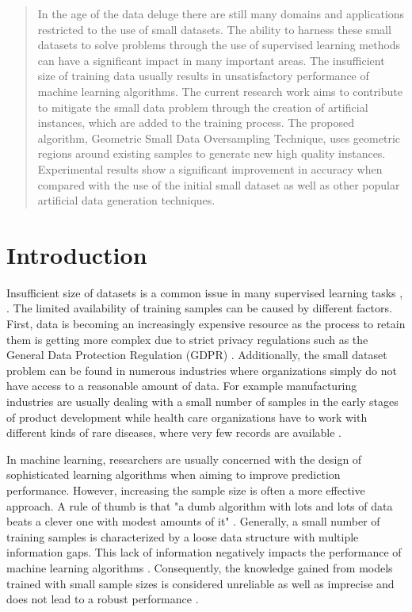 \begin{abstract}
In the age of the data deluge there are still many domains and applications restricted to the use of small datasets. The ability to harness these small datasets to solve problems through the use of supervised learning methods can have a significant impact in many important areas. The insufficient size of training data usually results in unsatisfactory performance of machine learning algorithms. The current research work aims to contribute to mitigate the small data problem through the creation of artificial instances, which are added to the training process. The proposed algorithm, Geometric Small Data Oversampling Technique, uses geometric regions around existing samples to generate new high quality instances. Experimental results show a significant improvement in accuracy when compared with the use of the initial small dataset as well as other popular artificial data generation techniques.
\end{abstract}

\section{Introduction}
Insufficient size of datasets is a common issue in many supervised learning tasks \cite{Niyogi.1998}, \cite{AbdulLateh.2017}. The limited availability of training samples can be caused by different factors. First, data is becoming an increasingly expensive resource \cite{Li.2007} as the process to retain them is getting more complex due to strict privacy regulations such as the General Data Protection Regulation (GDPR) \cite{EuropeanCommission.2019}. Additionally, the small dataset problem can be found in numerous industries where organizations simply do not have access to a reasonable amount of data. For example manufacturing industries are usually dealing with a small number of samples in the early stages of product development while health care organizations have to work with different kinds of rare diseases, where very few records are available \cite{AbdulLateh.2017}.

In machine learning, researchers are usually concerned with the design of sophisticated learning algorithms when aiming to improve prediction performance. However, increasing the sample size is often a more effective approach. A rule of thumb is that "a dumb algorithm with lots and lots of data beats a clever one with modest amounts of it" \cite{Domingos.2012}. Generally, a small number of training samples is characterized by a loose data structure with multiple information gaps. This lack of information negatively impacts the performance of machine learning algorithms \cite{Lin.2018}. Consequently, the knowledge gained from models trained with small sample sizes is considered unreliable as well as imprecise and does not lead to a robust performance \cite{AbdulLateh.2017}.

